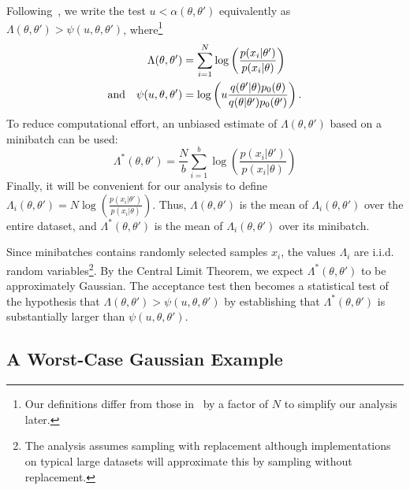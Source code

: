 \documentclass[twoside]{article} \usepackage{aistats2017}
\begin{document}
Following~\citet{icml2014c1_bardenet14}, we write the test
$u<\alpha(\theta,\theta')$ equivalently as $\Lambda(\theta,\theta') >
\psi(u,\theta,\theta')$, where\footnote{Our definitions differ from those
in~\citet{icml2014c1_bardenet14} by a factor of $N$ to simplify our analysis
later.}
\begin{equation}
\begin{split} 
\Lambda(\theta,\theta') & = \sum_{i=1}^N \log\left(\frac{p(x_i|\theta')}{p(x_i|\theta)}\right) \\  
{\rm and} \quad \psi(u,\theta,\theta') &= \log\left(u\frac{q(\theta'|\theta)p_0(\theta)}{q(\theta|\theta')p_0(\theta')}\right).
\end{split}
\end{equation}
To reduce computational effort, an unbiased estimate of $\Lambda(\theta,\theta')$
based on a minibatch can be used:
\begin{equation}
\Lambda^*(\theta,\theta') = \frac{N}{b}\sum_{i=1}^b \log\left(\frac{p(x_i|\theta')}{p(x_i|\theta)}\right)  
\end{equation}
Finally, it will be convenient for our analysis to define
$\Lambda_i(\theta,\theta') = N\log(\frac{p(x_i|\theta')}{p(x_i|\theta)})$.
Thus, $\Lambda(\theta,\theta')$ is the mean of $\Lambda_i(\theta,\theta')$ over
the entire dataset, and $\Lambda^*(\theta,\theta')$ is the mean of
$\Lambda_i(\theta,\theta')$ over its minibatch. 

Since minibatches contains randomly selected samples $x_i$, the values
$\Lambda_i$ are i.i.d. random variables\footnote{The analysis assumes sampling
with replacement although implementations on typical large datasets will
approximate this by sampling without replacement.}.  By the Central Limit
Theorem, we expect $\Lambda^*(\theta,\theta')$ to be approximately Gaussian. The
acceptance test then becomes a statistical test of the hypothesis that
$\Lambda(\theta,\theta')>\psi(u,\theta,\theta')$ by establishing that
$\Lambda^*(\theta,\theta')$ is substantially larger than
$\psi(u,\theta,\theta')$.


\subsection{A Worst-Case Gaussian Example}\label{ssec:gaussian_example}
\end{document}
